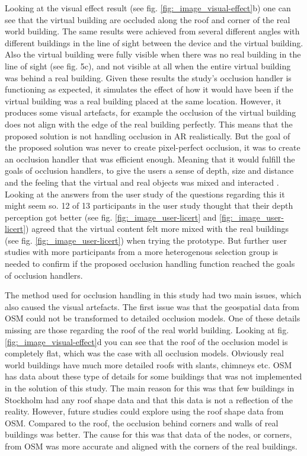 Looking at the visual effect result (see fig. \ref{fig:_image_visual-effect}b) one can see that the virtual building are occluded along the roof and corner of the real world building. The same results were achieved from several different angles with different buildings in the line of sight between the device and the virtual building. Also the virtual building were fully visible when there was no real building in the line of sight (see fig. 5c), and not visible at all when the entire virtual building was behind a real building. Given these results the study's occlusion handler is functioning as expected, it simulates the effect of how it would have been if the virtual building was a real building placed at the same location. However, it produces some visual artefacts, for example the occlusion of the virtual building does not align with the edge of the real building perfectly. This means that the proposed solution is not handling occlusion in AR realistically. But the goal of the proposed solution was never to create pixel-perfect occlusion, it was to create an occlusion handler that was efficient enough. Meaning that it would fulfill the goals of occlusion handlers, to give the users a sense of depth, size and distance and the feeling that the virtual and real objects was mixed and interacted \cite{shah2012occlusion}. Looking at the answers from the user study of the questions regarding this it might seem so. 12 of 13 participants in the user study thought that their depth perception got better (see fig. \ref{fig:_image_user-licert} and \ref{fig:_image_user-licert}) agreed that the virtual content felt more mixed with the real buildings (see fig. \ref{fig:_image_user-licert}) when trying the prototype. But further user studies with more participants from a more heterogenous selection group is needed to confirm if the proposed occlusion handling function reached the goals of occlusion handlers.

The method used for occlusion handling in this study had two main issues, which also caused the visual artefacts. The first issue was that the geospatial data from OSM could not be transformed to detailed occlusion models. One of these details missing are those regarding the roof of the real world building. Looking at fig.  \ref{fig:_image_visual-effect}d you can see that the roof of the occlusion model is completely flat, which was the case with all occlusion models. Obviously real world buildings have much more detailed roofs with slants, chimneys etc. OSM has data about these type of details for some buildings \cite{osm3Dbuildings} that was not implemented in the solution of this study. The main reason for this was that few buildings in Stockholm had any roof shape data and that this data is not a reflection of the reality. However, future studies could explore using the roof shape data from OSM. Compared to the roof, the occlusion behind corners and walls of real buildings was better. The cause for this was that data of the nodes, or corners, from OSM was more accurate and aligned with the corners of the real buildings.

